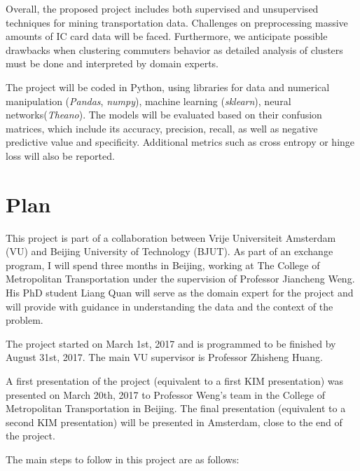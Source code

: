 \documentclass{article}
\begin{document}
Overall, the proposed project includes both supervised and unsupervised techniques for mining transportation data. Challenges on preprocessing massive amounts of IC card data will be faced. Furthermore, we anticipate possible drawbacks when clustering commuters behavior as detailed analysis of clusters must be done and interpreted by domain experts. 

The project will be coded in Python, using libraries for data and numerical manipulation (\textit{Pandas}, \textit{numpy}), machine learning (\textit{sklearn}), neural networks(\textit{Theano}). The models will be evaluated based on their confusion matrices, which include its accuracy, precision, recall, as well as negative predictive value and specificity. Additional metrics such as cross entropy or hinge loss will also be reported. 


\section{Plan}
This project is part of a collaboration between Vrije Universiteit Amsterdam (VU) and Beijing University of Technology (BJUT). As part of an exchange program, I will spend three months in Beijing, working at The College of Metropolitan Transportation under the supervision of Professor Jiancheng Weng. His PhD student Liang Quan will serve as the domain expert for the project and will provide with guidance in understanding the data and the context of the problem. 

The project started on March 1st, 2017 and is programmed to be finished by August 31st, 2017. The main VU supervisor is Professor Zhisheng Huang. 

A first presentation of the project (equivalent to a first KIM presentation) was presented on March 20th, 2017 to Professor Weng's team in the College of Metropolitan Transportation in Beijing. The final presentation (equivalent to a second KIM presentation) will be presented in Amsterdam, close to the end of the project.

The main steps to follow in this project are as follows:
\end{document}

